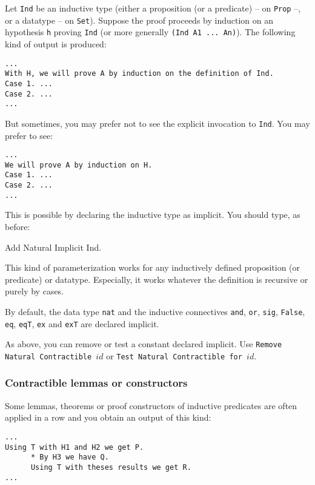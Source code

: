 Let \verb=Ind= be an inductive type (either a proposition (or a
predicate) -- on \verb=Prop= --, or a datatype -- on \verb=Set=).
Suppose the proof proceeds by induction on an hypothesis \verb=h=
proving \verb=Ind= (or more generally \verb=(Ind A1 ... An)=). The
following kind of output is produced:

\begin{verbatim}
...
With H, we will prove A by induction on the definition of Ind.
Case 1. ...
Case 2. ...
...
\end{verbatim}

But sometimes, you may prefer not to see the explicit invocation to
\verb=Ind=. You may prefer to see:

\begin{verbatim}
...
We will prove A by induction on H.
Case 1. ...
Case 2. ...
...
\end{verbatim}

This is possible by declaring the inductive type as implicit. You should
type, as before:

\begin{coq_example*}
Add Natural Implicit Ind.
\end{coq_example*}

This kind of parameterization works for any inductively defined
proposition (or predicate) or datatype. Especially, it works whatever
the definition is recursive or purely by cases.

By default, the data type \verb=nat= and the inductive connectives
\verb=and=, \verb=or=, \verb=sig=, \verb=False=, \verb=eq=,
\verb=eqT=, \verb=ex= and \verb=exT= are declared implicit.

As above, you can remove or test a constant declared implicit.  Use
{\tt Remove Natural Contractible $id$} or {\tt Test Natural
Contractible for $id$}.


\subsubsection*{Contractible lemmas or constructors}

Some lemmas, theorems or proof constructors of inductive predicates are
often applied in a row and you obtain an output of this kind:

\begin{verbatim}
...
Using T with H1 and H2 we get P.
      * By H3 we have Q.
      Using T with theses results we get R.
...
\end{verbatim}

